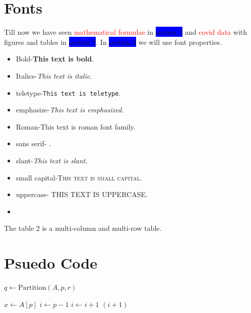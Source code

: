\documentclass{article}
\begin{document}
\section{Fonts}
Till now we have seen \textcolor{red}{mathematical formulae} in \colorbox{blue}{section 1} and \textcolor{red}{covid data} with figures and tables in \colorbox{blue}{section 2}. 
In \colorbox{blue}{section 3} we will use font properties. \begin{itemize}
\item Bold-\textbf{This text is bold}. 
\item Italics-\textit{This text is italic}. 
\item teletype-\texttt{This text is teletype}. 
\item emphasize-\emph{This text is emphasized}. 
\item Roman-\rm {This text is roman font family}. 
\item sans serif- .
\item slant-\sl{This text is slant}. 
\item small capital-\textsc{This text is small capital.} 
\item uppercase- THIS TEXT IS UPPERCASE. 
\item {}
\end{itemize}
 The table 2 is a multi-column and multi-row table.

\newpage
\pagecolor{white}
\section{Psuedo Code}
\begin{algorithm2e}
        \State $q \gets \text{Partition}(A, p, r)$
        \State {}
        \State {}
    \EndIf
\EndFunction

    \State $x \gets A[p]$ 
    \State $i \gets p - 1$
            \State $i \gets i + 1$
            \State {}
        \EndIf
    \EndFor
    \State {}
    \State \Return $(i + 1)$
\EndFunction
\end{algorithm2e}
\end{document}
